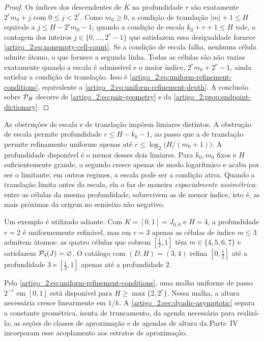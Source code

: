 \begin{proof}
Os índices dos descendentes de $K$ na profundidade $r$ são exatamente
$2^rm_0+j$ com $0\le j<2^r$. Como $m_0\ge0$, a condição de translação
$|m|+1\le H$ equivale a $j\le H-2^rm_0-1$; quando a condição de escala
$k_0+r+1\le H$ vale, a contagem dos inteiros $j\in\{0,\ldots,2^r-1\}$ que
satisfazem essa desigualdade fornece \eqref{artigo_2:eq:nonempty-cell-count}. Se a condição
de escala falha, nenhuma célula admite átomo, o que fornece a segunda linha.
Todas as células são não vazias exatamente quando a escala é admissível e o
maior índice, $2^rm_0+2^r-1$, ainda satisfaz a condição de translação. Isso é
\eqref{artigo_2:eq:uniform-refinement-conditions}, equivalente a
\eqref{artigo_2:eq:uniform-refinement-depth}. A conclusão sobre $\mathcal{P}_H$ decorre de
\eqref{artigo_2:eq:pair-geometry} e da \cref{artigo_2:prop:endpoint-dictionary}.
\end{proof}

\begin{remark}\label{map:artigo_2:4.6}
\label{artigo_2:rem:asymmetry}
As obstruções de escala e de translação impõem limiares distintos. A obstrução de escala permite profundidade
$r\le H-k_0-1$, ao passo que a de translação permite refinamento uniforme apenas
até $r\le\log_2\bigl(H/(m_0+1)\bigr)$. A profundidade disponível é o menor
desses dois limiares. Para $k_0,m_0$ fixos e $H$ suficientemente grande, o
segundo cresce apenas de modo logarítmico e acaba por ser o limitante; em
outros regimes, a escala pode ser a condição ativa. Quando a translação
limita antes da escala, ela o faz de maneira \emph{espacialmente assimétrica}:
entre as células da mesma profundidade, sobrevivem as de menor índice, isto é,
as mais próximas da origem no semieixo não negativo.

Um exemplo é utilizado adiante. Com $K=[0,1]=J_{0,0}$ e $H=4$, a profundidade
$r=2$ é uniformemente refinável, mas em $r=3$ apenas as células de índice
$m\le3$ admitem átomos: as quatro células que cobrem $[\tfrac12,1]$ têm
$m\in\{4,5,6,7\}$ e satisfazem $\mathcal{P}_4(J)=\varnothing$. O catálogo com
$(D,H)=(3,4)$ refina $[0,\tfrac12]$ até a profundidade $3$ e
$[\tfrac12,1]$ apenas até a profundidade $2$.

Pela \eqref{artigo_2:eq:uniform-refinement-conditions}, uma malha uniforme de passo
$2^{-r}$ em $[0,1]$ está disponível para
$H\ge\max\{2,2^r\}$. Nessa malha, a altura necessária cresce linearmente em $1/h$. A \cref{artigo_2:sec:dyadic-asymptotic} separa a constante geométrica, isenta de
truncamento, da agenda necessária para realizá-la; as
seções de classes de aproximação e de agendas de altura da Parte~IV incorporam esse acoplamento
aos estratos de aproximação.
\end{remark}

